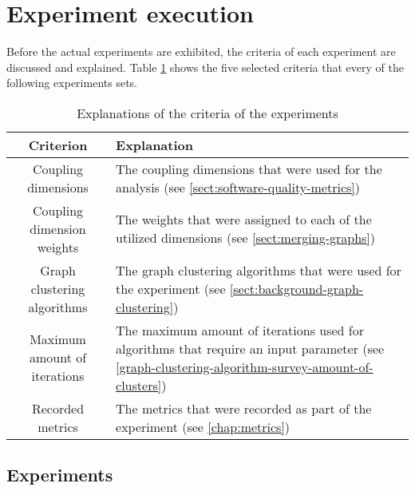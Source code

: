 \documentclass[12pt,a4paper]{report}
\begin{document}
\section{Experiment execution} \label{sect:experiment-execution}

Before the actual experiments are exhibited, the criteria of each experiment are discussed
and explained. Table \ref{table:experiment-criteria} shows the five selected criteria that
every of the following experiments sets.

\begin{table}[ht!]
\def\arraystretch{1.55}
\begin{tabularx}{\textwidth}{|c|X|}
\hline
Criterion & Explanation \\
\hline\hline

Coupling dimensions            & The coupling dimensions that were used for the analysis (see \ref{sect:software-quality-metrics}) \\\hline

Coupling dimension weights     & The weights that were assigned to each of the utilized dimensions (see \ref{sect:merging-graphs}) \\\hline

Graph clustering algorithms     & The graph clustering algorithms that were used for the experiment (see \ref{sect:background-graph-clustering}) \\\hline

Maximum amount of iterations    & The maximum amount of iterations used for algorithms that require an input parameter (see \ref{graph-clustering-algorithm-survey-amount-of-clusters}) \\\hline

Recorded metrics                & The metrics that were recorded as part of the experiment (see \ref{chap:metrics}) \\\hline

\end{tabularx}
\caption{Explanations of the criteria of the experiments}
\label{table:experiment-criteria}
\end{table}


\subsection{Experiments}
\end{document}
